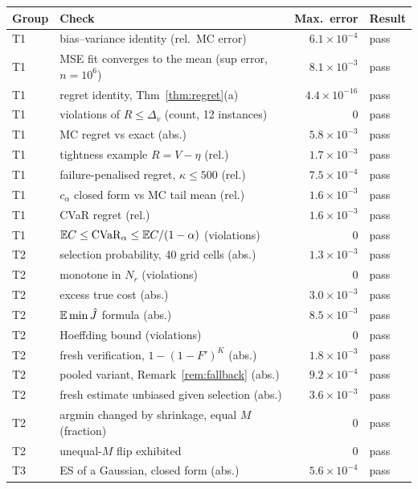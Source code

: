 \begin{table}[h]
\centering\small
\begin{tabular}{@{}llrl@{}}
\hline
Group & Check & Max.\ error & Result\\
\hline
T1 & bias--variance identity (rel.\ MC error) & $6.1\!\times\!10^{-4}$ & pass\\
T1 & MSE fit converges to the mean (sup error, $n=10^6$) & $8.1\!\times\!10^{-3}$ & pass\\
T1 & regret identity, Thm~\ref{thm:regret}(a) & $4.4\!\times\!10^{-16}$ & pass\\
T1 & violations of $R\le\Delta_v$ (count, 12 instances) & $0$ & pass\\
T1 & MC regret vs exact (abs.) & $5.8\!\times\!10^{-3}$ & pass\\
T1 & tightness example $R=V-\eta$ (rel.) & $1.7\!\times\!10^{-3}$ & pass\\
T1 & failure-penalised regret, $\kappa\le500$ (rel.) & $7.5\!\times\!10^{-4}$ & pass\\
T1 & $c_\alpha$ closed form vs MC tail mean (rel.) & $1.6\!\times\!10^{-3}$ & pass\\
T1 & CVaR regret (rel.) & $1.6\!\times\!10^{-3}$ & pass\\
T1 & $\mathbb{E} C\le\operatorname{CVaR}_\alpha\le\mathbb{E} C/(1-\alpha)$ (violations) & $0$ & pass\\
T2 & selection probability, 40 grid cells (abs.) & $1.3\!\times\!10^{-3}$ & pass\\
T2 & monotone in $N_r$ (violations) & $0$ & pass\\
T2 & excess true cost (abs.) & $3.0\!\times\!10^{-3}$ & pass\\
T2 & $\mathbb{E}\min\hat J$ formula (abs.) & $8.5\!\times\!10^{-3}$ & pass\\
T2 & Hoeffding bound (violations) & $0$ & pass\\
T2 & fresh verification, $1-(1-F')^K$ (abs.) & $1.8\!\times\!10^{-3}$ & pass\\
T2 & pooled variant, Remark~\ref{rem:fallback} (abs.) & $9.2\!\times\!10^{-4}$ & pass\\
T2 & fresh estimate unbiased given selection (abs.) & $3.6\!\times\!10^{-3}$ & pass\\
T2 & argmin changed by shrinkage, equal $M$ (fraction) & $0$ & pass\\
T2 & unequal-$M$ flip exhibited & $0$ & pass\\
T3 & ES of a Gaussian, closed form (abs.) & $5.6\!\times\!10^{-4}$ & pass\\

\end{tabular}
\end{table}
